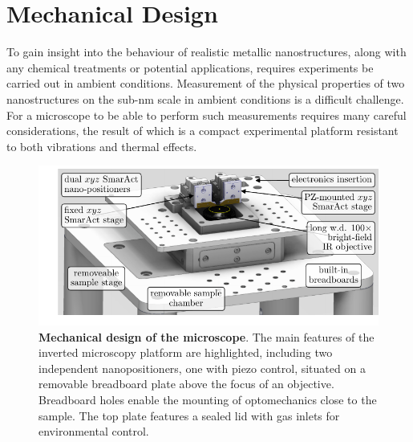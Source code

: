\documentclass{article}
\begin{document}
\section{Mechanical Design}

{\color{red}To gain insight into the behaviour of realistic metallic nanostructures, along with any chemical treatments or potential applications, requires experiments be carried out in ambient conditions.} Measurement of the physical properties of two nanostructures on the sub-nm scale in ambient conditions is a difficult challenge. For a microscope to be able to perform such measurements requires many careful considerations, the result of which is a compact experimental platform resistant to both vibrations and thermal effects.

\begin{figure}[tb]
\centering
\includegraphics[clip=true, trim=15 10 0 0]{figures/microscope_stage_design}
\caption[Mechanical design of the microscope]{\textbf{Mechanical design of the microscope}. The main features of the inverted microscopy platform are highlighted, including two independent nanopositioners, one with piezo control, situated on a removable breadboard plate above the focus of an objective. Breadboard holes enable the mounting of optomechanics close to the sample. The top plate features a sealed lid with gas inlets for environmental control.}
\label{fig:mechanical_design}
\end{figure}
\end{document}
